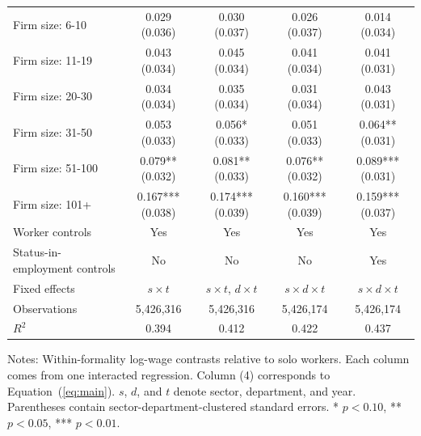 \begin{table}[htbp]
\begin{tabular}{lcccc}
    Firm size: 6-10 & 0.029 {\scriptsize (0.036)} & 0.030 {\scriptsize (0.037)} & 0.026 {\scriptsize (0.037)} & 0.014 {\scriptsize (0.034)} \\
    Firm size: 11-19 & 0.043 {\scriptsize (0.034)} & 0.045 {\scriptsize (0.034)} & 0.041 {\scriptsize (0.034)} & 0.041 {\scriptsize (0.031)} \\
    Firm size: 20-30 & 0.034 {\scriptsize (0.034)} & 0.035 {\scriptsize (0.034)} & 0.031 {\scriptsize (0.034)} & 0.043 {\scriptsize (0.031)} \\
    Firm size: 31-50 & 0.053 {\scriptsize (0.033)} & 0.056* {\scriptsize (0.033)} & 0.051 {\scriptsize (0.033)} & 0.064** {\scriptsize (0.031)} \\
    Firm size: 51-100 & 0.079** {\scriptsize (0.032)} & 0.081** {\scriptsize (0.033)} & 0.076** {\scriptsize (0.032)} & 0.089*** {\scriptsize (0.031)} \\
    Firm size: 101+ & 0.167*** {\scriptsize (0.038)} & 0.174*** {\scriptsize (0.039)} & 0.160*** {\scriptsize (0.039)} & 0.159*** {\scriptsize (0.037)} \\
    \midrule
    Worker controls & Yes & Yes & Yes & Yes \\
    Status-in-employment controls & No & No & No & Yes \\
    Fixed effects & $s\times t$ & $s\times t$, $d\times t$ & $s\times d\times t$ & $s\times d\times t$ \\
    Observations & 5,426,316 & 5,426,316 & 5,426,174 & 5,426,174 \\
    $R^2$ & 0.394 & 0.412 & 0.422 & 0.437 \\
    \bottomrule
  \end{tabular}
  \vspace{0.3em}
  \begin{minipage}{0.95\textwidth}
  \footnotesize
  Notes: Within-formality log-wage contrasts relative to solo workers. Each column comes from one interacted regression. Column (4) corresponds to Equation~(\ref{eq:main}). $s$, $d$, and $t$ denote sector, department, and year. Parentheses contain sector-department-clustered standard errors. * $p<0.10$, ** $p<0.05$, *** $p<0.01$.
  \end{minipage}
\end{table}
